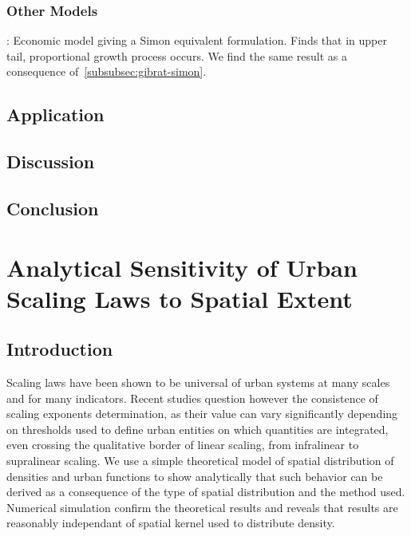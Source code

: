 \cite{bettencourt2008large}


\subsubsection{Other Models}

\cite{gabaix1999zipf} : Economic model giving a Simon equivalent formulation. Finds that in upper tail, proportional growth process occurs. We find the same result as a consequence of~\ref{subsubsec:gibrat-simon}.




\subsection{Application}




\subsection{Discussion}






\subsection*{Conclusion}






\newpage




\section{Analytical Sensitivity of Urban Scaling Laws to Spatial Extent}



\subsection{Introduction}



Scaling laws have been shown to be universal of urban systems at many scales and for many indicators. Recent studies question however the consistence of scaling exponents determination, as their value can vary significantly depending on thresholds used to define urban entities on which quantities are integrated, even crossing the qualitative border of linear scaling, from infralinear to supralinear scaling. We use a simple theoretical model of spatial distribution of densities and urban functions to show analytically that such behavior can be derived as a consequence of the type of spatial distribution and the method used. Numerical simulation confirm the theoretical results and reveals that results are reasonably independant of spatial kernel used to distribute density.



